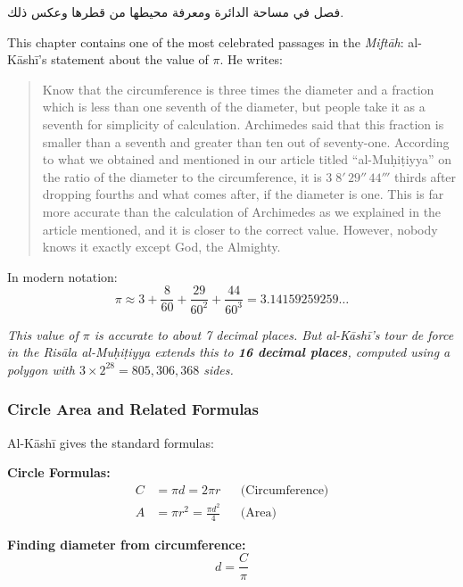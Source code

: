 \documentclass[11pt,a4paper]{article}
\newenvironment{arabicbox}{%
  \begin{framed}
  \begin{minipage}{\linewidth-2\fboxsep-2\fboxrule}
  \setlength{\parindent}{0pt}
  \linespread{1.3}\selectfont
}{%
  \end{minipage}
  \end{framed}
}
\newenvironment{mathalgo}{%
  \par\vspace{0.3cm}
  \begin{framed}
  \setlength{\parindent}{0pt}
}{%
  \end{framed}
  \par\vspace{0.3cm}
}
\newcommand{\cnote}[1]{\textcolor{notecolor}{\textit{#1}}}
\begin{document}
\begin{arabicbox}
\begin{Arabic}
فصل في مساحة الدائرة ومعرفة محيطها من قطرها وعكس ذلك.
\end{Arabic}
\end{arabicbox}

\vspace{0.3cm}

This chapter contains one of the most celebrated passages in the
\textit{Mift\=ah}: al-K\=ash\=i's statement about the value of $\pi$. He
writes:

\begin{quote}
Know that the circumference is three times the diameter and a fraction
which is less than one seventh of the diameter, but people take it as a
seventh for simplicity of calculation. Archimedes said that this
fraction is smaller than a seventh and greater than ten out of
seventy-one. According to what we obtained and mentioned in our article
titled ``al-Mu\d{h}i\d{t}iyya'' on the ratio of the diameter to the
circumference, it is $3\;8'\,29''\,44'''$ thirds after dropping fourths
and what comes after, if the diameter is one. This is far more accurate
than the calculation of Archimedes as we explained in the article
mentioned, and it is closer to the correct value. However, nobody knows
it exactly except God, the Almighty.
\end{quote}

\noindent In modern notation:
\[
\pi \approx 3 + \frac{8}{60} + \frac{29}{60^2} + \frac{44}{60^3} =
3.14159259259\ldots
\]

\cnote{This value of $\pi$ is accurate to about 7 decimal places. But
al-K\=ash\=i's tour de force in the \textit{Ris\=ala al-Mu\d{h}i\d{t}iyya}
extends this to \textbf{16 decimal places}, computed using a polygon with
$3 \times 2^{28} = 805{,}306{,}368$ sides.}

\subsubsection{Circle Area and Related Formulas}

Al-K\=ash\=i gives the standard formulas:

\begin{mathalgo}
\textbf{Circle Formulas:}
\begin{align*}
C &= \pi d = 2\pi r && \text{(Circumference)} \\
A &= \pi r^2 = \frac{\pi d^2}{4} && \text{(Area)}
\end{align*}

\textbf{Finding diameter from circumference:}
\[
d = \frac{C}{\pi}
\]
\end{mathalgo}
\end{document}
